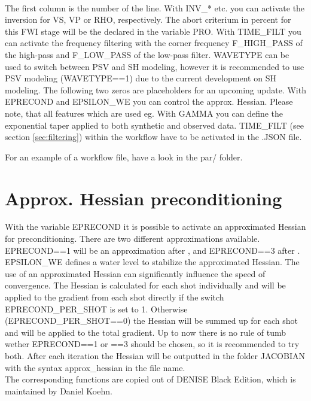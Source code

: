 \ \\
The first column is the number of the line. With INV\_* etc. you can activate the inversion for VS, VP or RHO, respectively. The abort criterium in percent for this FWI stage will be the declared in the variable PRO. With TIME\_FILT you can activate the frequency filtering with the corner frequency F\_HIGH\_PASS of the high-pass and F\_LOW\_PASS of the low-pass filter. WAVETYPE can be used to switch between PSV and SH modeling, however it is recommended to use PSV modeling (WAVETYPE==1) due to the current development on SH modeling. The following two zeros are placeholders for an upcoming update. With EPRECOND and EPSILON\_WE you can control the approx. Hessian. Please note, that all features which are used eg.  With GAMMA you can define the exponential taper applied to both synthetic and observed data. TIME\_FILT (see section \ref{sec:filtering}) within the workflow have to be activated in the .JSON file.

For an example of a workflow file, have a look in the par/ folder.


\section{Approx. Hessian preconditioning}
{\color{blue}{\begin{verbatim}
			"EPRECOND" : "3",
			"EPSILON_WE" : "0.005",
			
			"EPRECOND_PER_SHOT" : "1",
\end{verbatim}}}
{\color{red}{\begin{verbatim}
Default values are:
			"EPRECOND" : "0",
\end{verbatim}}}

With the variable EPRECOND it is possible to activate an approximated Hessian for preconditioning. There are two different approximations available. EPRECOND==1 will be an approximation after \cite{shin2001efficient}, and EPRECOND==3 after \cite{plessix2004frequency}. EPSILON\_WE defines a water level to stabilize the approximated Hessian. The use of an approximated Hessian can significantly influence the speed of convergence. The Hessian is calculated for each shot individually and will be applied to the gradient from each shot directly if the switch EPRECOND\_PER\_SHOT is set to 1. Otherwise (EPRECOND\_PER\_SHOT==0) the Hessian will be summed up for each shot and will be applied to the total gradient. 
Up to now there is no rule of tumb wether EPRECOND==1 or ==3 should be chosen,  so it is recommended to try both. After each iteration the Hessian will be outputted in the folder JACOBIAN with the syntax \*approx\_hessian\* in the file name.\\
The corresponding functions are copied out of DENISE Black Edition, which is maintained by Daniel Koehn. 

